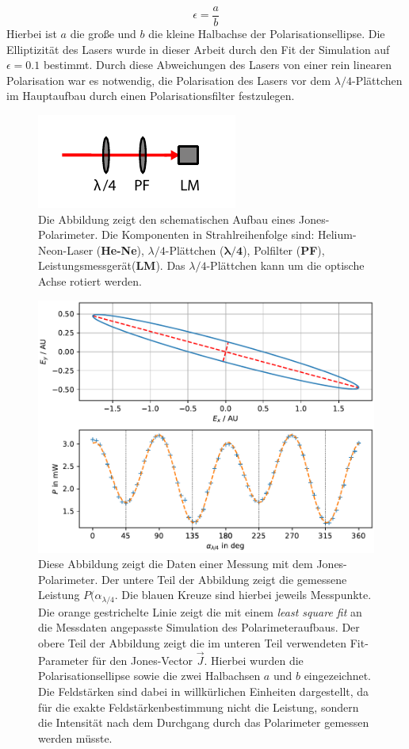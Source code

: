 \documentclass[titlepage,  ngerman]{article}
\begin{document}
	\begin{equation}
		\epsilon = \dfrac{a}{b}
	\end{equation}
	Hierbei ist $a$ die große und $b$ die kleine Halbachse der Polarisationsellipse. Die Elliptizität des Lasers wurde in dieser Arbeit durch den Fit der Simulation auf $\epsilon = 0.1 $ bestimmt. Durch diese Abweichungen des Lasers von einer rein linearen Polarisation war es notwendig, die Polarisation des Lasers vor dem $\lambda /4$-Plättchen im Hauptaufbau durch einen Polarisationsfilter festzulegen.
	\begin{figure}
		\centering
		\includegraphics[width=0.5\linewidth]{figures/Polarimeter}
		\caption[Jones-Polarimeter]{Die Abbildung zeigt den schematischen Aufbau eines Jones-Polarimeter. Die Komponenten in Strahlreihenfolge sind: Helium-Neon-Laser (\textbf{He-Ne}), $\lambda/4$-Plättchen ($\boldsymbol{\lambda / 4}$), Polfilter (\textbf{PF}), Leistungsmessgerät(\textbf{LM}). Das $\lambda/4$-Plättchen kann um die optische Achse rotiert werden.}
		\label{fig:polarimeter}
	\end{figure}
	\begin{figure}
		\centering
		\includegraphics[width=0.7\linewidth]{figures/graph_polarimeter}
		\caption[Polarimeter Simulation]{Diese Abbildung zeigt die Daten einer Messung mit dem Jones-Polarimeter. Der untere Teil der Abbildung zeigt die gemessene Leistung $P(\alpha_{\lambda /4}$. Die blauen Kreuze sind hierbei jeweils Messpunkte. Die orange gestrichelte Linie zeigt die mit einem \textit{least square fit} an die Messdaten angepasste Simulation des Polarimeteraufbaus. Der obere Teil der Abbildung zeigt die im unteren Teil verwendeten Fit-Parameter für den Jones-Vector $\vec{J}$. Hierbei wurden die Polarisationsellipse sowie die zwei Halbachsen $a$ und $b$ eingezeichnet. Die Feldstärken sind dabei in willkürlichen Einheiten dargestellt, da für die exakte Feldstärkenbestimmung nicht die Leistung, sondern die Intensität nach dem Durchgang durch das Polarimeter gemessen werden müsste.}
		\label{fig:graphpolarimeter}
	\end{figure}
\end{document}
